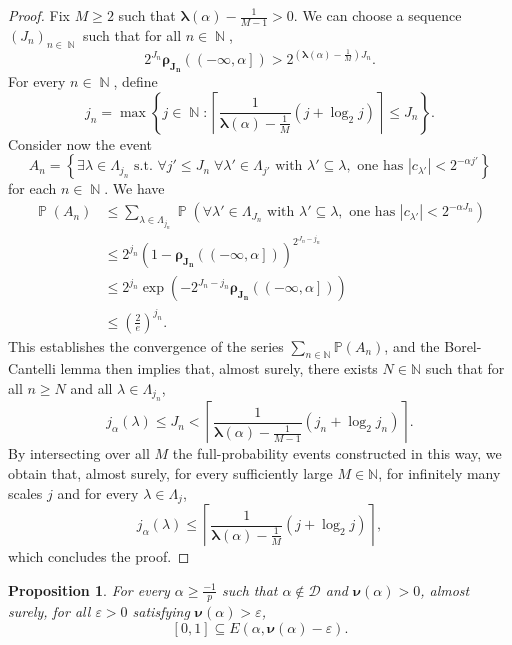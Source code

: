\documentclass[a4paper,11pt,oneside]{article}
\DeclareMathOperator{\N}{\mathbb{N}}
\DeclareMathOperator{\prob}{\mathbb{P}}
\newcommand{\ccint}[1]{\left[{#1}\right]}
\newcommand{\ocint}[1]{\left({#1}\right]}
\newcommand{\modu}[1]{\left\vert{#1}\right\vert}
\theoremstyle{definition}
\theoremstyle{plain}
\newtheorem{prop}[defi]{Proposition}
\begin{document}
\begin{proof}
Fix $M\geq 2$ such that $\bm{\lambda}(\alpha)-\frac{1}{M-1}>0$. We can choose a sequence $(J_n)_{n\in\N}$ such that for all $n\in\N$, 
\[
2^{J_n}\bm{\rho_{J_n}}(\ocint{-\infty,\alpha})>2^{\left(\bm{\lambda}(\alpha)-\frac{1}{M}\right)J_n}.
\]
For every $n\in\N$, define
\[
j_n=\max\left\{j\in\N:\left\lceil\frac{1}{\bm{\lambda}(\alpha)-\frac{1}{M}}(j+\log_2j)\right\rceil \leq J_n\right\}.
\]
Consider now the event
\[
A_n=\left\{\exists\lambda\in\Lambda_{j_n}\text{ s.t. }\forall j'\leq J_n\;\forall\lambda'\in\Lambda_{j'}\text{ with }\lambda'\subseteq\lambda,\text{ one has }\modu{c_{\lambda'}}<2^{-\alpha j'}\right\}
\]
for each $n\in\N$. We have
\begin{align*}
\prob(A_n)
& \leq \sum_{\lambda\in\Lambda_{j_n}}\prob\left(\forall \lambda'\in\Lambda_{J_n}\text{ with }\lambda'\subseteq\lambda,\text{ one has }\modu{c_{\lambda'}}<2^{-\alpha J_n}\right) \\
& \leq 2^{j_n}\left(1-\bm{\rho_{J_n}}(\ocint{-\infty,\alpha})\right)^{2^{J_n-j_n}} \\
& \leq 2^{j_n}\exp\left(-2^{J_n-j_n}\bm{\rho_{J_n}}(\ocint{-\infty,\alpha})\right) \\
& \leq \left(\frac{2}{e}\right)^{j_n}.
\end{align*}
This establishes the convergence of the series $\sum_{n \in \mathbb{N}} \mathbb{P}(A_n)$, and the Borel-Cantelli lemma then implies that, almost surely, there exists $N \in \mathbb{N}$ such that for all $n \geq N$ and all $\lambda \in \Lambda_{j_n}$,
\[
j_\alpha(\lambda)\leq J_n<\left\lceil\frac{1}{\bm{\lambda}(\alpha)-\frac{1}{M-1}}(j_n+\log_2j_n)\right\rceil. 
\]
By intersecting over all $M$ the full-probability events constructed in this way, we obtain that, almost surely, for every sufficiently large $M \in \mathbb{N}$, for infinitely many scales $j$ and for every $\lambda\in\Lambda_j$, 
\[
j_\alpha(\lambda)\leq \left\lceil\frac{1}{\bm{\lambda}(\alpha)-\frac{1}{M}}(j+\log_2j)\right\rceil,
\]
which concludes the proof.
\end{proof}

\begin{prop}\label{leb1}
For every $\alpha\geq\frac{-1}{p}$ such that $\alpha\notin\mathcal{D}$ and $\bm{\nu}(\alpha)>0$, almost surely, for all $\varepsilon>0$ satisfying $\bm{\nu}(\alpha)>\varepsilon$,
\[
\ccint{0,1}\subseteq E(\alpha,\bm{\nu}(\alpha)-\varepsilon).
\]
\end{prop}
\end{document}
